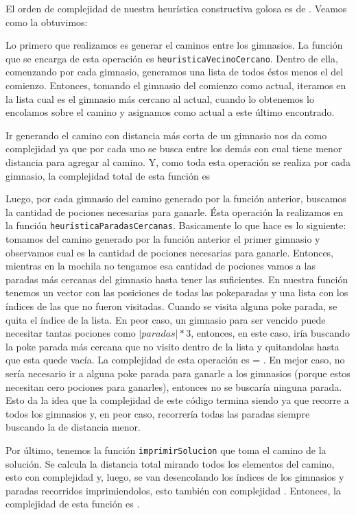 El orden de complejidad de nuestra heurística constructiva golosa es de . Veamos como la obtuvimos:

Lo primero que realizamos es generar el caminos entre los gimnasios. La función que se encarga de esta operación es \texttt{heuristicaVecinoCercano}. Dentro de ella, comenzando por cada gimnasio, generamos una lista de todos éstos menos el del comienzo. Entonces, tomando el gimnasio del comienzo como actual, iteramos en la lista cual es el gimnasio más cercano al actual, cuando lo obtenemos lo encolamos sobre el camino y asignamos como actual a este último encontrado.

Ir generando el camino con distancia más corta de un gimnasio nos da como complejidad  ya que por cada uno se busca entre los demás con cual tiene menor distancia para agregar al camino. Y, como toda esta operación se realiza por cada gimnasio, la complejidad total de esta función es 

Luego, por cada gimnasio del camino generado por la función anterior, buscamos la cantidad de pociones necesarias para ganarle. Ésta operación la realizamos en la función \texttt{heuristicaParadasCercanas}. Basicamente lo que hace es lo siguiente: tomamos del camino generado por la función anterior el primer gimnasio y observamos cual es la cantidad de pociones necesarias para ganarle. Entonces, mientras en la mochila no tengamos esa cantidad de pociones vamos a las paradas más cercanas del gimnasio hasta tener las suficientes. En nuestra función tenemos un vector con las posiciones de todas las pokeparadas y una lista con los índices de las que no fueron visitadas. Cuando se visita alguna poke parada, se quita el índice de la lista. En peor caso, un gimnasio para ser vencido puede necesitar tantas pociones como $|paradas|*3$, entonces, en este caso, iría buscando la poke parada más cercana que no visito dentro de la lista y quitandolas hasta que esta quede vacía. La complejidad de esta operación es  = . En mejor caso, no sería necesario ir a alguna poke parada para ganarle a los gimnasios (porque estos necesitan cero pociones para ganarles), entonces no se buscaría ninguna parada. 
Esto da la idea que la complejidad de este código termina siendo  ya que recorre a todos los gimnasios y, en peor caso, recorrería todas las paradas siempre buscando la de distancia menor.

Por último, tenemos la función \texttt{imprimirSolucion} que toma el camino de la solución. Se calcula la distancia total mirando todos los elementos del camino, esto con complejidad  y, luego, se van desencolando los índices de los gimnasios y paradas recorridos imprimiendolos, esto también con complejidad . Entonces, la complejidad de esta función es .



